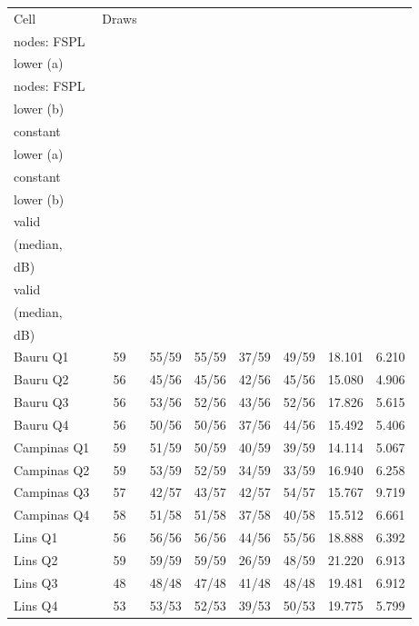 \begin{tabular}{lccccccc}
\toprule
Cell & Draws & \celula{Valid \\ \relax nodes: FSPL \\ \relax lower (a)} & \celula{Valid \\ \relax nodes: FSPL \\ \relax lower (b)} & \celula{All nodes: \\ \relax constant \\ \relax lower (a)} & \celula{All nodes: \\ \relax constant \\ \relax lower (b)} & \celula{Constant, \\ \relax valid \\ \relax (median, \\ \relax dB)} & \celula{FSPL (a), \\ \relax valid \\ \relax (median, \\ \relax dB)} \\
\midrule
Bauru Q1 & 59 & 55/59 & 55/59 & 37/59 & 49/59 & 18.101 & 6.210 \\
Bauru Q2 & 56 & 45/56 & 45/56 & 42/56 & 45/56 & 15.080 & 4.906 \\
Bauru Q3 & 56 & 53/56 & 52/56 & 43/56 & 52/56 & 17.826 & 5.615 \\
Bauru Q4 & 56 & 50/56 & 50/56 & 37/56 & 44/56 & 15.492 & 5.406 \\
Campinas Q1 & 59 & 51/59 & 50/59 & 40/59 & 39/59 & 14.114 & 5.067 \\
Campinas Q2 & 59 & 53/59 & 52/59 & 34/59 & 33/59 & 16.940 & 6.258 \\
Campinas Q3 & 57 & 42/57 & 43/57 & 42/57 & 54/57 & 15.767 & 9.719 \\
Campinas Q4 & 58 & 51/58 & 51/58 & 37/58 & 40/58 & 15.512 & 6.661 \\
Lins Q1 & 56 & 56/56 & 56/56 & 44/56 & 55/56 & 18.888 & 6.392 \\
Lins Q2 & 59 & 59/59 & 59/59 & 26/59 & 48/59 & 21.220 & 6.913 \\
Lins Q3 & 48 & 48/48 & 47/48 & 41/48 & 48/48 & 19.481 & 6.912 \\
Lins Q4 & 53 & 53/53 & 52/53 & 39/53 & 50/53 & 19.775 & 5.799 \\

\end{tabular}
